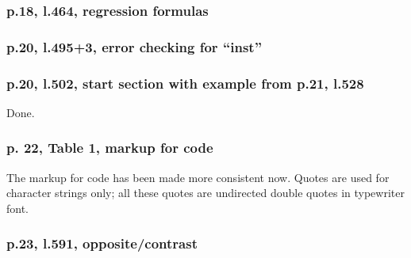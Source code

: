 \documentclass[12pt,english]{scrartcl}
\begin{document}
\subsubsection{p.18, l.464, regression formulas}

\subsubsection{p.20, l.495+3, error checking for ``inst''}

\subsubsection{p.20, l.502, start section with example from p.21, l.528}
Done.

\subsubsection{p. 22, Table 1, markup for code}
The markup for code has been made more consistent now.
Quotes are used for character strings only;
all these quotes are undirected double quotes in typewriter font.

\subsubsection{p.23, l.591, opposite/contrast}
\end{document}
